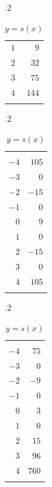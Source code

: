 \begin{exercises}
\begin{problem}
\begin{table}[!htb]
\begin{widepage}
\begin{subtable}{.2\textwidth}
\begin{tabular}{rr}
				 $1$           & $9$           \\\normalline
				 $2$           & $32$          \\\normalline
				 $3$           & $75$          \\\normalline
				 $4$           & $144$         \\\lastline
			 \end{tabular}
		 \end{subtable}
		 \hfill
		 \begin{subtable}{.2\textwidth}
			 \centering
			 \caption{$y=r(x)$}
			 \label{poly:tab:findformular}
			 \begin{tabular}{rr}
				 \beforeheading
				 \heading{$x$} & \heading{$y$} \\ \afterheading
				 $-4$          & $105$         \\\normalline
				 $-3$          & $0$           \\\normalline
				 $-2$          & $-15$         \\\normalline
				 $-1$          & $0$           \\\normalline
				 $0$           & $9$           \\\normalline
				 $1$           & $0$           \\\normalline
				 $2$           & $-15$         \\\normalline
				 $3$           & $0$           \\\normalline
				 $4$           & $105$         \\\lastline
			 \end{tabular}
		 \end{subtable}
		 \hfill
		 \begin{subtable}{.2\textwidth}
			 \centering
			 \caption{$y=s(x)$}
			 \label{poly:tab:findformulas}
			 \begin{tabular}{rr}
				 \beforeheading
				 \heading{$x$} & \heading{$y$} \\ \afterheading
				 $-4$          & $75$          \\\normalline
				 $-3$          & $0$           \\\normalline
				 $-2$          & $-9$          \\\normalline
				 $-1$          & $0$           \\\normalline
				 $0$           & $3$           \\\normalline
				 $1$           & $0$           \\\normalline
				 $2$           & $15$          \\\normalline
				 $3$           & $96$          \\\normalline
				 $4$           & $760$         \\\lastline
			 \end{tabular}
		 \end{subtable}
		 \end{widepage}
	 \end{table}


\end{problem}
\end{exercises}
